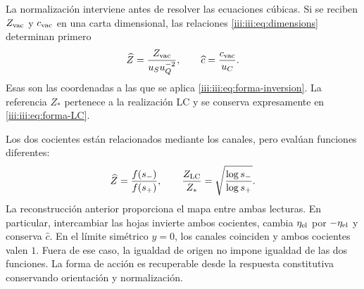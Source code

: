 La normalización interviene antes de resolver las ecuaciones cúbicas.
Si se reciben $Z_{\rm vac}$ y $c_{\rm vac}$ en una carta dimensional,
las relaciones \eqref{iii:iii:eq:dimensions} determinan primero
\[
 \widehat Z=\frac{Z_{\rm vac}}{u_Su_Q^{-2}},\qquad
 \widehat c=\frac{c_{\rm vac}}{u_C}.
\]
Esas son las coordenadas a las que se aplica
\eqref{iii:iii:eq:forma-inversion}. La referencia $Z_*$ pertenece a la
realización LC y se conserva expresamente en \eqref{iii:iii:eq:forma-LC}.

Los dos cocientes están relacionados mediante los canales, pero evalúan
funciones diferentes:
\begin{equation}
 \widehat Z=\frac{f(s_-)}{f(s_+)},\qquad
 \frac{Z_{\rm LC}}{Z_*}
       =\sqrt{\frac{\log s_-}{\log s_+}}.
 \label{iii:iii:eq:forma-dos-cocientes}
\end{equation}
La reconstrucción anterior proporciona el mapa entre ambas lecturas.
En particular, intercambiar las hojas invierte ambos cocientes, cambia
$\eta_{\rm el}$ por $-\eta_{\rm el}$ y conserva $\widehat c$.
En el límite simétrico $y=0$, los canales coinciden y ambos cocientes
valen $1$. Fuera de ese caso, la igualdad de origen no impone igualdad
de las dos funciones. La forma de acción es recuperable desde la
respuesta constitutiva conservando orientación y normalización.
